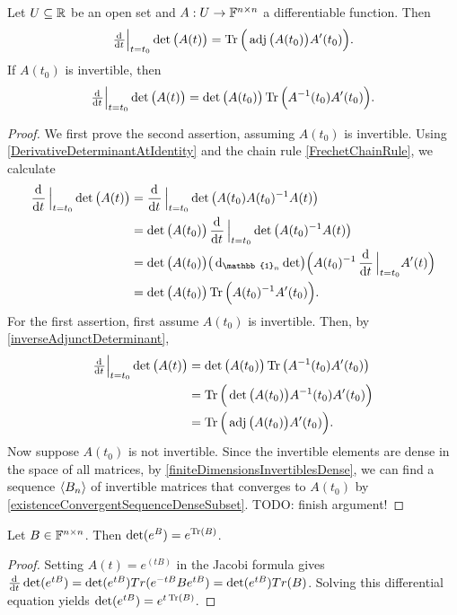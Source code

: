\begin{proposition} \label{JacobisFormula}
Let $U\subseteq \mathbb{R}$ be an open set and $A: U\to \mathbb{F}^{n\times n}$ a differentiable function. Then
\[ \od{}{t}\Big|_{t=t_0}\det\big(A(t)\big) = \Tr\Big(\adj\big(A(t_0)\big)A'(t_0)\Big). \]
If $A(t_0)$ is invertible, then
\[ \od{}{t}\Big|_{t=t_0}\det\big(A(t)\big) = \det\big(A(t_0)\big)\Tr\Big(A^{-1}(t_0)A'(t_0)\Big). \]
\end{proposition}
\begin{proof}
We first prove the second assertion, assuming $A(t_0)$ is invertible. Using \ref{DerivativeDeterminantAtIdentity} and the chain rule \ref{FrechetChainRule}, we calculate
\begin{align*}
\dod{}{t}\Big|_{t=t_0}\det\big(A(t)\big) &= \dod{}{t}\Big|_{t=t_0}\det\big(A(t_0)A(t_0)^{-1}A(t)\big) \\
&= \det\big(A(t_0)\big)\dod{}{t}\Big|_{t=t_0}\det\big(A(t_0)^{-1}A(t)\big) \\
&= \det\big(A(t_0)\big)\big(\diff{_{\mathbb{1}_n}\det}\big)\Big(A(t_0)^{-1}\dod{}{t}\Big|_{t=t_0}A'(t)\Big) \\
&= \det\big(A(t_0)\big)\Tr\Big(A(t_0)^{-1}A'(t_0)\Big).
\end{align*}
For the first assertion, first assume $A(t_0)$ is invertible. Then, by \ref{inverseAdjunctDeterminant},
\begin{align*}
\od{}{t}\Big|_{t=t_0}\det\big(A(t)\big) &= \det\big(A(t_0)\big)\Tr\big(A^{-1}(t_0)A'(t_0)\big) \\
&= \Tr\Big(\det\big(A(t_0)\big)A^{-1}(t_0)A'(t_0)\Big) \\
&= \Tr\Big(\adj\big(A(t_0)\big)A'(t_0)\Big).
\end{align*}
Now suppose $A(t_0)$ is not invertible. Since the invertible elements are dense in the space of all matrices, by \ref{finiteDimensionsInvertiblesDense}, we can find a sequence $\left\langle B_n \right\rangle$ of invertible matrices that converges to $A(t_0)$ by \ref{existenceConvergentSequenceDenseSubset}. TODO: finish argument!
\end{proof}
\begin{corollary}
Let $B\in \mathbb{F}^{n\times n}$. Then $\det(e^{B}) = e^{\operatorname{Tr}(B)}$.
\end{corollary}
\begin{proof}
Setting $A(t) = e^(t B)$ in the Jacobi formula gives $\od{}{t}\det(e^{tB}) = \det(e^{tB})Tr(e^{-tB}Be^{tB}) = \det(e^{tB})Tr(B)$. Solving this differential equation yields $\det(e^{tB}) = e^{t\operatorname{Tr}(B)}$.
\end{proof}

